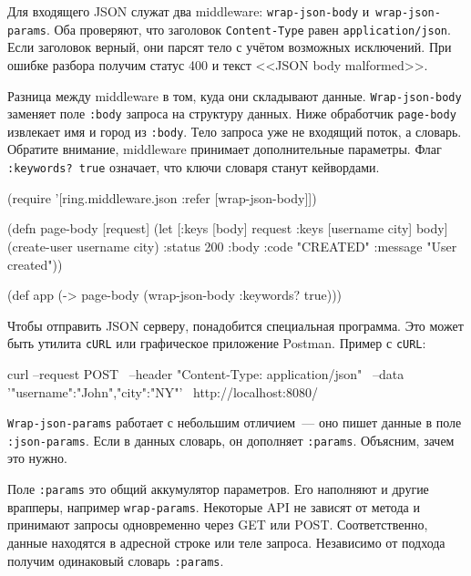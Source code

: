Для входящего JSON служат два middleware: \verb|wrap-json-body|
и~\verb|wrap-json-params|. Оба проверяют, что заголовок \verb|Content-Type|
равен \verb|application/json|. Если заголовок верный, они парсят тело с учётом
возможных исключений. При ошибке разбора получим статус 400 и текст <<JSON body
malformed>>.

Разница между middleware в том, куда они складывают
данные. \verb|Wrap-json-body| заменяет поле \verb|:body| запроса на
структуру данных. Ниже обработчик \verb|page-body| извлекает имя и город из
\verb|:body|. Тело запроса уже не входящий поток, а словарь. Обратите
внимание, middleware принимает дополнительные параметры. Флаг \verb|:keywords? true|
означает, что ключи словаря станут кейвордами.

\begin{english}
  \begin{clojure}
(require '[ring.middleware.json :refer [wrap-json-body]])

(defn page-body [request]
  (let [{:keys [body]} request
        {:keys [username city]} body]
    (create-user username city)
    {:status 200
     :body {:code "CREATED"
            :message "User created"}}))

(def app (-> page-body
             (wrap-json-body {:keywords? true})))
  \end{clojure}
\end{english}


Чтобы отправить JSON серверу, понадобится специальная программа. Это может быть
утилита \verb|cURL| или графическое приложение
Postman. Пример с \verb|cURL|:

\begin{english}
  \begin{bash}
curl --request POST \
     --header "Content-Type: application/json" \
     --data '{"username":"John","city":"NY"}' \
     http://localhost:8080/
  \end{bash}
\end{english}

\verb|Wrap-json-params| работает с небольшим отличием~--- оно пишет данные в
поле \verb|:json-params|. Если в данных словарь, он дополняет
\verb|:params|. Объясним, зачем это нужно.

Поле \verb|:params| это общий аккумулятор параметров. Его наполняют и другие
врапперы, например \verb|wrap-params|. Некоторые API не зависят от метода и
принимают запросы одновременно через GET или POST. Соответственно, данные
находятся в адресной строке или теле запроса. Независимо от подхода получим
одинаковый словарь \verb|:params|.

